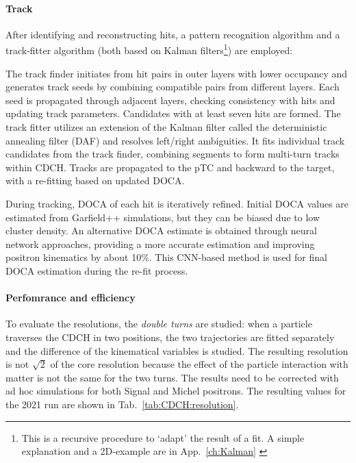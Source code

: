 \begin{refsection}
        \paragraph{Track} After identifying and reconstructing hits, a pattern recognition algorithm and a track-fitter algorithm (both based on Kalman filters\footnote{This is a recursive procedure to `adapt' the result of a fit. A simple explanation and a 2D-example are in App.~\ref{ch:Kalman} \cite{mythesis}}) are employed:

        \begin{outline}
            \1 The track finder initiates from hit pairs in outer layers with lower occupancy and generates track seeds by combining compatible pairs from different layers. 
            Each seed is propagated through adjacent layers, checking consistency with hits and updating track parameters. 
            Candidates with at least seven hits are formed.
            \1 The track fitter utilizes an extension of the Kalman filter called the deterministic annealing filter (DAF) \cite{Kalman:DAF} and resolves left/right ambiguities. 
            It fits individual track candidates from the track finder, combining segments to form multi-turn tracks within CDCH. 
            Tracks are propagated to the pTC and backward to the target, with a re-fitting based on updated DOCA.
        \end{outline}

        \noindent
        During tracking, DOCA of each hit is iteratively refined. Initial DOCA values are estimated from Garfield++ simulations, but they can be biased due to low cluster density. 
        An alternative DOCA estimate is obtained through neural network approaches, providing a more accurate estimation and improving positron kinematics by about 10\%. 
        This CNN-based method is used for final DOCA estimation during the re-fit process.


        \paragraph{Perfomrance and efficiency}
        To evaluate the resolutions, the \textit{double turns} are studied: when a particle traverses the CDCH in two positions, the two trajectories are fitted separately and the difference of the kinematical variables is studied.
        The resulting resolution is not $\sqrt{2}$ of the core resolution because the effect of the particle interaction with matter is not the same for the two turns.
        The results need to be corrected with ad hoc simulations for both Signal and Michel positrons.
        The resulting values for the 2021 run are shown in Tab.~\ref{tab:CDCH:resolution}.
        


\end{refsection}
